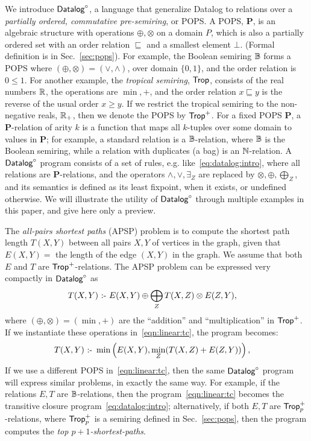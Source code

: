 We introduce $\text{\sf Datalog}^\circ$, a language that generalize Datalog to relations
over a {\em partially ordered, commutative pre-semiring}, or POPS.  A
POPS, $\bm P$, is an algebraic structure with operations
$\oplus, \otimes$ on a domain $P$, which is also a partially ordered set with an order
relation $\sqsubseteq$ and a smallest element $\bot$. (Formal
definition is in Sec.~\ref{sec:pops}).  For example, the Boolean
semiring $\mathbb B$ forms a POPS where $(\oplus,\otimes) = (\vee, \wedge)$, over domain
$\{0,1\}$, and the order relation is $0 \leq 1$.  For another example, the {\em
  tropical semiring}, $\text{\sf Trop}$, consists of the real numbers $\mathbb R$, the
operations are $\min, +$, and the order relation $x \sqsubseteq y$ is
the reverse of the usual order $x \geq y$.  If
we restrict the tropical semiring to the non-negative reals, $\mathbb R_+$, then
we denote the POPS by $\text{\sf Trop}^+$.  For a fixed POPS $\bm P$, a
$\bm P$-relation of arity $k$ is a function that maps all $k$-tuples
over some domain to values in $\bm P$; for example, a standard
relation is a $\mathbb B$-relation, where $\mathbb B$ is the Boolean semiring, while
a relation with duplicates (a bag) is an $\mathbb N$-relation.  A $\text{\sf Datalog}^\circ$
program consists of a set of rules, e.g.
like~\eqref{eq:datalog:intro}, where all relations are
$\bm P$-relations, and the operators $\wedge, \vee, \exists_Z$ are
replaced by $\otimes, \oplus, \bigoplus_Z$, and its semantics is
defined as its least fixpoint, when it exists, or undefined otherwise.
We will illustrate the utility of $\text{\sf Datalog}^\circ$ through multiple examples in
this paper, and give here only a preview.

\begin{ex} \label{ex:intro} The {\em all-pairs shortest paths} (APSP) problem is to compute the
  shortest path length $T(X,Y)$ between all pairs $X,Y$ of vertices in
  the graph, given that $E(X,Y)=$ the length of the edge $(X,Y)$ in
  the graph.  We assume that both $E$ and $T$ are $\text{\sf Trop}^+$-relations.
  The APSP problem can be expressed very compactly in $\text{\sf Datalog}^\circ$ as
  \begin{align}
    T(X,Y) &\text{ :- } E(X,Y) \oplus \bigoplus_Z T(X,Z) \otimes E(Z,Y), \label{eqn:linear:tc}
  \end{align}
%
  where $(\oplus,\otimes) = (\min, +)$ are the ``addition'' and
  ``multiplication'' in $\text{\sf Trop}^+$.  If we instantiate these operations
  in~\eqref{eqn:linear:tc}, the program becomes:
  \begin{align}
    T(X,Y) &\text{ :- } \min\left(E(X,Y), \min_Z (T(X,Z) + E(Z,Y))\right), \label{eqn:apsp}
  \end{align}
%
  If we use a different POPS in~\eqref{eqn:linear:tc}, then the same
  $\text{\sf Datalog}^\circ$ program will express similar problems, in exactly the same
  way. For example, if the relations $E, T$ are $\mathbb B$-relations, then
  the program~\eqref{eqn:linear:tc} becomes the {\sf transitive
    closure} program~\eqref{eq:datalog:intro}; alternatively, if both
  $E, T$ are $\text{\sf Trop}^+_p$-relations, where $\text{\sf Trop}^+_p$ is a semiring
  defined in Sec.~\ref{sec:pops}, then the program computes the {\em
    top $p+1$-shortest-paths}.
\end{ex}


